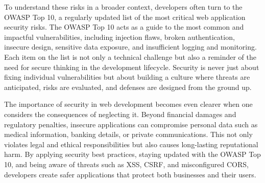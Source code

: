 To understand these risks in a broader context, developers often turn to the OWASP Top 10, a regularly updated list of the most critical web application security risks. The OWASP Top 10 acts as a guide to the most common and impactful vulnerabilities, including injection flaws, broken authentication, insecure design, sensitive data exposure, and insufficient logging and monitoring. Each item on the list is not only a technical challenge but also a reminder of the need for secure thinking in the development lifecycle. Security is never just about fixing individual vulnerabilities but about building a culture where threats are anticipated, risks are evaluated, and defenses are designed from the ground up.

The importance of security in web development becomes even clearer when one considers the consequences of neglecting it. Beyond financial damages and regulatory penalties, insecure applications can compromise personal data such as medical information, banking details, or private communications. This not only violates legal and ethical responsibilities but also causes long-lasting reputational harm. By applying security best practices, staying updated with the OWASP Top 10, and being aware of threats such as XSS, CSRF, and misconfigured CORS, developers create safer applications that protect both businesses and their users.

